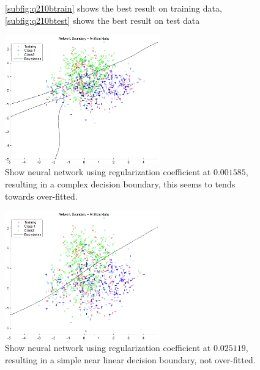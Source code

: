 \begin{figure}[!htbp]
  \centering
  \caption{\ref{subfig:q210btrain} shows the best result on training
    data, \ref{subfig:q210btest} shows the best result on test data}
  \label{fig:q210bregulization}
\end{figure}

\begin{figure}[!htbp]
  \centering
  \includegraphics[width=0.6\textwidth]{./images/q210b_reg2}
  \caption{Show neural network using regularization coefficient at $0.001585$, resulting in
    a complex decision boundary, this seems to tends towards over-fitted.}
  \label{fig:q210breg2}
\end{figure}

\begin{figure}[!htbp]
  \centering
  \includegraphics[width=0.6\textwidth]{./images/q210b_reg3}
  \caption{Show neural network using regularization coefficient at $0.025119$, resulting in
    a simple near linear decision boundary, not over-fitted.}
  \label{fig:q210breg3}
\end{figure}


